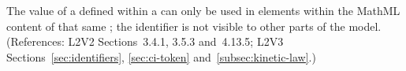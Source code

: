 The  value of a \Parameter defined within a \KineticLaw
can only be used in  elements within the MathML content
of that same \KineticLaw; the identifier is not visible to other
parts of the model.  (References: L2V2 Sections~3.4.1, 3.5.3 
and~4.13.5; L2V3 Sections~\ref{sec:identifiers}, \ref{sec:ci-token}
and~\ref{subsec:kinetic-law}.)
